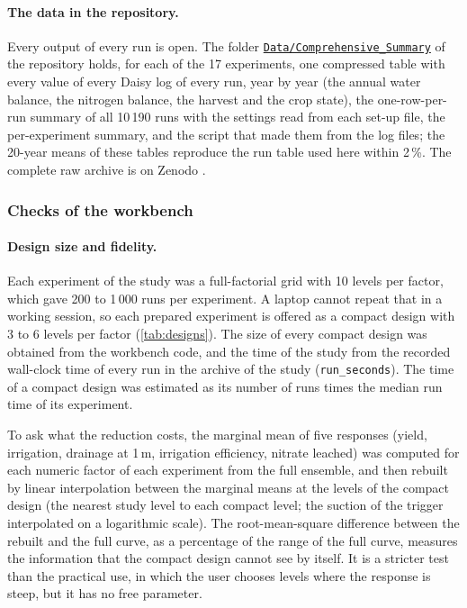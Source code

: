 \documentclass[preprint,12pt]{elsarticle}
\newcommand{\csurl}{https://github.com/halilunaziru73-creator/Coupled-Water-Fluxes-Pore-Scale-Dynamics-Precision-Irrigation-Mulching-Feedback-Loops/tree/main/Data/Comprehensive_Summary}
\newcommand{\cslink}{\href{\csurl}{\nolinkurl{Data/Comprehensive_Summary}}}
\begin{document}
\paragraph{The data in the repository.} Every output of every run is open. The folder \cslink{} of the repository holds, for each of the 17 experiments, one compressed table with every value of every Daisy log of every run, year by year (the annual water balance, the nitrogen balance, the harvest and the crop state), the one-row-per-run summary of all 10\,190 runs with the settings read from each set-up file, the per-experiment summary, and the script that made them from the log files; the 20-year means of these tables reproduce the run table used here within 2\,\%. The complete raw archive is on Zenodo \cite{HaliluData}.




\subsubsection{Checks of the workbench}
\paragraph{Design size and fidelity.}
Each experiment of the study was a full-factorial grid with 10 levels per factor, which gave 200 to 1\,000 runs per experiment. A laptop cannot repeat that in a working session, so each prepared experiment is offered as a compact design with 3 to 6 levels per factor (\cref{tab:designs}). The size of every compact design was obtained from the workbench code, and the time of the study from the recorded wall-clock time of every run in the archive of the study (\texttt{run\_seconds}). The time of a compact design was estimated as its number of runs times the median run time of its experiment.

To ask what the reduction costs, the marginal mean of five responses (yield, irrigation, drainage at 1\,m, irrigation efficiency, nitrate leached) was computed for each numeric factor of each experiment from the full ensemble, and then rebuilt by linear interpolation between the marginal means at the levels of the compact design (the nearest study level to each compact level; the suction of the trigger interpolated on a logarithmic scale). The root-mean-square difference between the rebuilt and the full curve, as a percentage of the range of the full curve, measures the information that the compact design cannot see by itself. It is a stricter test than the practical use, in which the user chooses levels where the response is steep, but it has no free parameter.
\end{document}
